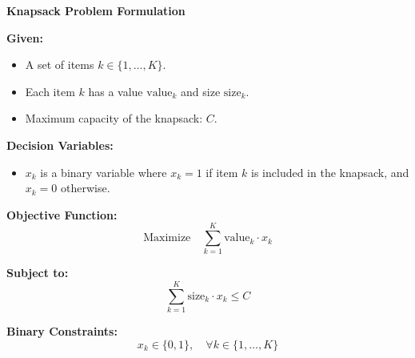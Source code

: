\documentclass{article}
\begin{document}
\textbf{Knapsack Problem Formulation}

\textbf{Given:}
\begin{itemize}
    \item A set of items \( k \in \{1, \ldots, K\} \).
    \item Each item \( k \) has a value \( \text{value}_k \) and size \( \text{size}_k \).
    \item Maximum capacity of the knapsack: \( C \).
\end{itemize}

\textbf{Decision Variables:}
\begin{itemize}
    \item \( x_k \) is a binary variable where \( x_k = 1 \) if item \( k \) is included in the knapsack, and \( x_k = 0 \) otherwise.
\end{itemize}

\textbf{Objective Function:}
\[
\text{Maximize} \quad \sum_{k=1}^{K} \text{value}_k \cdot x_k
\]

\textbf{Subject to:}
\[
\sum_{k=1}^{K} \text{size}_k \cdot x_k \leq C
\]

\textbf{Binary Constraints:}
\[
x_k \in \{0, 1\}, \quad \forall k \in \{1, \ldots, K\}
\]
\end{document}
